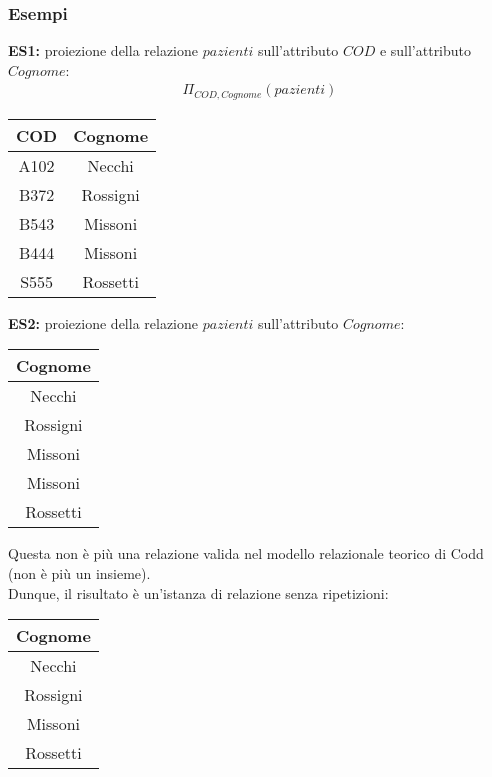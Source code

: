 \subsubsection{Esempi}
\textbf{ES1:} proiezione della relazione $pazienti$ sull'attributo $COD$ e sull'attributo $Cognome$:
    \begin{equation}\begin{aligned}
        \Pi_{COD, Cognome}(pazienti)
    \end{aligned}\end{equation}
    \begin{center}\begin{tabular}{|c|c|}\hline
        \textbf{COD} & \textbf{Cognome}\\
        \hline
        A102 & Necchi\\ \hline
        B372 & Rossigni\\ \hline
        B543 & Missoni\\ \hline
        B444 & Missoni\\ \hline
        S555 & Rossetti\\ \hline
     \end{tabular}\end{center}
\textbf{ES2:} proiezione della relazione $pazienti$ sull'attributo $Cognome$:
    \begin{center}\begin{tabular}{|c|}\hline
        \textbf{Cognome}\\ \hline
        Necchi\\ \hline
        Rossigni\\ \hline
        Missoni\\ \hline
        Missoni\\ \hline
        Rossetti\\ \hline
     \end{tabular}\end{center}
Questa non è più una relazione valida nel modello relazionale teorico di Codd (non è più un insieme).\\
Dunque, il risultato è un'istanza di relazione senza ripetizioni:
    \begin{center}\begin{tabular}{|c|}\hline
        \textbf{Cognome}\\ \hline
        Necchi\\ \hline
        Rossigni\\ \hline
        Missoni\\ \hline
        Rossetti\\ \hline
     \end{tabular}\end{center}
    
